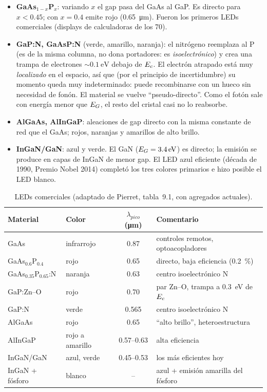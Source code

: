 \begin{itemize}
  \item \textbf{GaAs$_{1-x}$P$_x$}: variando $x$ el gap pasa del GaAs al GaP. Es directo
  para $x<0.45$; con $x=0.4$ emite rojo (\SI{0.65}{\micro m}). Fueron los primeros LEDs
  comerciales (displays de calculadoras de los 70).
  \item \textbf{GaP:N, GaAsP:N} (verde, amarillo, naranja): el nitrógeno reemplaza al P (es de
  la misma columna, no dona portadores: es \emph{isoelectrónico}) y crea una trampa de
  electrones $\sim\SI{0.1}{\eV}$ debajo de $E_c$. El electrón atrapado está muy
  \emph{localizado} en el espacio, así que (por el principio de incertidumbre) su momento
  queda muy indeterminado: puede recombinarse con un hueco sin necesidad de fonón. El
  material se vuelve ``pseudo-directo''. Como el fotón sale con energía menor que $E_G$, el
  resto del cristal casi no lo reabsorbe.
  \item \textbf{AlGaAs, AlInGaP}: aleaciones de gap directo con la misma constante de red
  que el GaAs; rojos, naranjas y amarillos de alto brillo.
  \item \textbf{InGaN/GaN}: azul y verde. El GaN ($\EG=\SI{3.4}{\eV}$) es directo; la emisión
  se produce en capas de InGaN de menor gap. El LED azul eficiente (década de 1990, Premio
  Nobel 2014) completó los tres colores primarios e hizo posible el LED blanco.
\end{itemize}

\begin{table}[H]
\centering\small
\caption{LEDs comerciales (adaptado de Pierret, tabla~9.1, con agregados actuales).}
\label{tab:leds}
\begin{tabular}{llcl}
\toprule
Material & Color & $\lambda_{pico}$ (\si{\micro m}) & Comentario \\
\midrule
GaAs                 & infrarrojo  & 0.87  & controles remotos, optoacopladores \\
GaAs$_{0.6}$P$_{0.4}$  & rojo        & 0.65  & directo, baja eficiencia (\SI{0.2}{\percent}) \\
GaAs$_{0.35}$P$_{0.65}$:N & naranja  & 0.63  & centro isoelectrónico N \\
GaP:Zn--O            & rojo        & 0.70  & par Zn--O, trampa a \SI{0.3}{\eV} de $E_c$ \\
GaP:N                & verde       & 0.565 & centro isoelectrónico N \\
AlGaAs               & rojo        & 0.65  & ``alto brillo'', heteroestructura \\
AlInGaP              & rojo a amarillo & 0.57--0.63 & alta eficiencia \\
InGaN/GaN            & azul, verde & 0.45--0.53 & los más eficientes hoy \\
InGaN + fósforo      & blanco      & --    & azul + emisión amarilla del fósforo \\
\bottomrule
\end{tabular}
\end{table}

